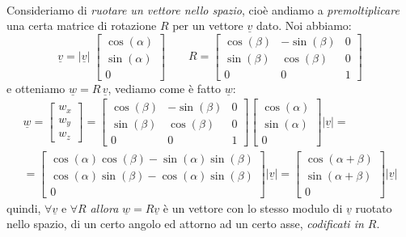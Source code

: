 \paragraph{}
Consideriamo di \emph{ruotare un vettore nello spazio}, cioè andiamo a \emph{premoltiplicare} una certa matrice di rotazione $R$ per un vettore $\underline{v}$ dato. Noi abbiamo:
\begin{equation*}
	\underline{v} = \vert\underline{v}\vert \; 
	\begin{bmatrix}
		\cos(\alpha) \\
		\sin(\alpha) \\
		0
	\end{bmatrix}	
	\qquad
	R =
	\begin{bmatrix}
		\cos(\beta) & -\sin(\beta) & 0 \\
		\sin(\beta) & \cos(\beta) & 0 \\
		0 & 0 & 1
	\end{bmatrix}
\end{equation*}
e otteniamo $\underline{w}=R\,\underline{v}$, vediamo come è fatto $\underline{w}$:
\begin{align*}
	\underline{w} = 
	\begin{bmatrix}
		w_x \\
		w_y \\
		w_z
	\end{bmatrix}
	=
	\begin{bmatrix}
		\cos(\beta) & -\sin(\beta) & 0 \\
		\sin(\beta) & \cos(\beta) & 0 \\
		0 & 0 & 1
	\end{bmatrix}
	\begin{bmatrix}
		\cos(\alpha) \\
		\sin(\alpha) \\
		0
	\end{bmatrix}
	\vert\underline{v}\vert = \\
	=
	\begin{bmatrix}
		\cos(\alpha)\cos(\beta) - \sin(\alpha)\sin(\beta) \\
		\cos(\alpha)\sin(\beta) - \cos(\alpha)\sin(\beta) \\
		0
	\end{bmatrix}
	\vert\underline{v}\vert = 
	\begin{bmatrix}
		\cos(\alpha + \beta) \\
		\sin(\alpha + \beta) \\
		0
	\end{bmatrix}
	\vert\underline{v}\vert
\end{align*}
quindi, $\forall\underline{v}$ e $\forall R$ \emph{allora} $\underline{w} = R \underline{v}$ è un vettore con lo stesso modulo di $\underline{v}$ ruotato nello spazio, di un certo angolo ed attorno ad un certo asse, \emph{codificati in $R$}.

